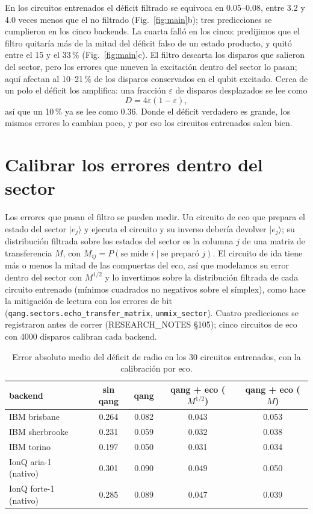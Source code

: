 \documentclass[11pt]{article}
\begin{document}
En los circuitos entrenados el déficit filtrado se equivoca en 0.05--0.08, entre 3.2 y 4.0 veces menos que el no
filtrado (Fig.~\ref{fig:main}b); tres predicciones se cumplieron en los cinco backends. La cuarta falló en los cinco:
predijimos que el filtro quitaría más de la mitad del déficit falso de un estado producto, y quitó entre el 15 y el
33\,\% (Fig.~\ref{fig:main}c). El filtro descarta los disparos que salieron del sector, pero los errores que mueven la
excitación dentro del sector lo pasan; aquí afectan al 10--21\,\% de los disparos conservados en el qubit excitado.
Cerca de un polo el déficit los amplifica: una fracción $\varepsilon$ de disparos desplazados se lee como
\begin{equation}
D=4\varepsilon(1-\varepsilon),
\end{equation}
así que un 10\,\% ya se lee como 0.36. Donde el déficit verdadero es grande, los mismos errores lo cambian poco, y por eso
los circuitos entrenados salen bien.

\section{Calibrar los errores dentro del sector}

Los errores que pasan el filtro se pueden medir. Un circuito de eco que prepara el estado del sector $|e_j\rangle$ y
ejecuta el circuito y su inverso debería devolver $|e_j\rangle$; su distribución filtrada sobre los estados del sector
es la columna $j$ de una matriz de transferencia $M$, con $M_{ij}=P(\text{se mide }i\mid\text{se preparó }j)$. El
circuito de ida tiene más o menos la mitad de las compuertas del eco, así que modelamos su error dentro del sector con
$M^{1/2}$ y lo invertimos sobre la distribución filtrada de cada circuito entrenado (mínimos cuadrados no negativos sobre
el símplex), como hace la mitigación de lectura con los errores de bit (\texttt{qang.sectors.echo\_transfer\_matrix},
\texttt{unmix\_sector}). Cuatro predicciones se registraron antes de correr (RESEARCH\_NOTES \S105); cinco circuitos de
eco con 4000 disparos calibran cada backend.

\begin{table}[h]
\centering\small
\begin{tabular}{lcccc}
\toprule
backend & sin qang & qang & qang + eco ($M^{1/2}$) & qang + eco ($M$) \\
\midrule
IBM brisbane & 0.264 & 0.082 & 0.043 & 0.053 \\
IBM sherbrooke & 0.231 & 0.059 & 0.032 & 0.038 \\
IBM torino & 0.197 & 0.050 & 0.031 & 0.034 \\
IonQ aria-1 (nativo) & 0.301 & 0.090 & 0.049 & 0.050 \\
IonQ forte-1 (nativo) & 0.285 & 0.089 & 0.047 & 0.039 \\
\bottomrule
\end{tabular}
\caption{Error absoluto medio del déficit de radio en los 30 circuitos entrenados, con la calibración por eco.}
\label{tab:echo}
\end{table}
\end{document}

